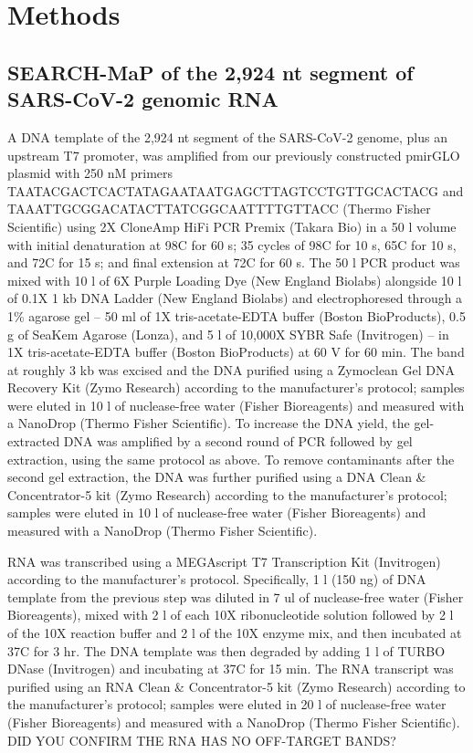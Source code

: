 \documentclass[main.tex]{subfiles}
\begin{document}
\section{Methods}
\label{methods}


\subsection{SEARCH-MaP of the 2,924 nt segment of SARS-CoV-2 genomic RNA}

A DNA template of the 2,924 nt segment of the SARS-CoV-2 genome, plus an upstream T7 promoter, was amplified from our previously constructed pmirGLO plasmid \cite{Lan2022} with 250 nM primers TAATACGACTCACTATAGAATAATGAGCTTAGTCCTGTTGCACTACG and TAAATTGCGGACATACTTATCGGCAATTTTGTTACC (Thermo Fisher Scientific) using 2X CloneAmp HiFi PCR Premix (Takara Bio) in a 50 \textmu l volume with initial denaturation at 98\textdegree C for 60 s; 35 cycles of 98\textdegree C for 10 s, 65\textdegree C for 10 s, and 72\textdegree C for 15 s; and final extension at 72\textdegree C for 60 s.
The 50 \textmu l PCR product was mixed with 10 \textmu l of 6X Purple Loading Dye (New England Biolabs) alongside 10 \textmu l of 0.1X 1 kb DNA Ladder (New England Biolabs) and electrophoresed through a 1\% agarose gel -- 50 ml of 1X tris-acetate-EDTA buffer (Boston BioProducts), 0.5 g of SeaKem Agarose (Lonza), and 5 \textmu l of 10,000X SYBR Safe (Invitrogen) -- in 1X tris-acetate-EDTA buffer (Boston BioProducts) at 60 V for 60 min.
The band at roughly 3 kb was excised and the DNA purified using a Zymoclean Gel DNA Recovery Kit (Zymo Research) according to the manufacturer's protocol; samples were eluted in 10 \textmu l of nuclease-free water (Fisher Bioreagents) and measured with a NanoDrop (Thermo Fisher Scientific).
To increase the DNA yield, the gel-extracted DNA was amplified by a second round of PCR followed by gel extraction, using the same protocol as above.
To remove contaminants after the second gel extraction, the DNA was further purified using a DNA Clean \& Concentrator-5 kit (Zymo Research) according to the manufacturer's protocol; samples were eluted in 10 \textmu l of nuclease-free water (Fisher Bioreagents) and measured with a NanoDrop (Thermo Fisher Scientific).

RNA was transcribed using a MEGAscript T7 Transcription Kit (Invitrogen) according to the manufacturer's protocol.
Specifically, 1 \textmu l (150 ng) of DNA template from the previous step was diluted in 7 ul of nuclease-free water (Fisher Bioreagents), mixed with 2 \textmu l of each 10X ribonucleotide solution followed by 2 \textmu l of the 10X reaction buffer and 2 \textmu l of the 10X enzyme mix, and then incubated at 37\textdegree C for 3 hr.
The DNA template was then degraded by adding 1 \textmu l of TURBO DNase (Invitrogen) and incubating at 37\textdegree C for 15 min.
The RNA transcript was purified using an RNA Clean \& Concentrator-5 kit (Zymo Research) according to the manufacturer's protocol; samples were eluted in 20 \textmu l of nuclease-free water (Fisher Bioreagents) and measured with a NanoDrop (Thermo Fisher Scientific).
DID YOU CONFIRM THE RNA HAS NO OFF-TARGET BANDS?
\end{document}
